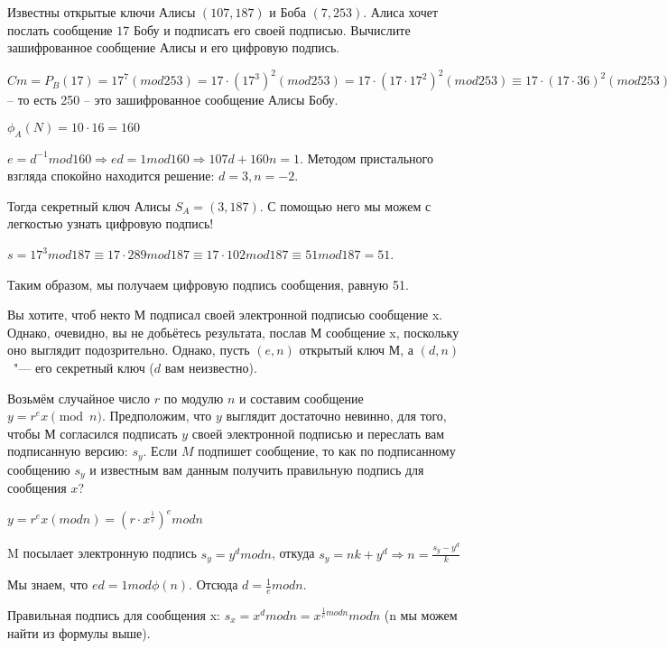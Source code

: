 \documentclass[12pt]{extreport}
\theoremstyle{definiton}
\theoremstyle{definition}
\theoremstyle{definition}
\newcounter{problem}
\newcounter{subproblem}
\def\beforPRskip{
	\bigskip
}
\def\pr{\beforPRskip\noindent\stepcounter{problem}{\bf \theproblem .\;}\setcounter{subproblem}{0}}
\def\prend{
	\bigskip
}
\begin{document}
	

\pr Известны открытые ключи Алисы $(107, 187)$ и Боба $(7, 253)$. Алиса хочет послать сообщение $17$ Бобу и подписать его своей подписью. Вычислите зашифрованное сообщение Алисы и его цифровую подпись.

\prend

$Cm = P_B(17) = 17^7 (mod 253) = 17 \cdot (17^3)^2 (mod 253) = 17 \cdot (17 \cdot 17^2)^2 (mod 253) \equiv 17 \cdot (17 \cdot 36)^2 (mod 253) \equiv 17 \cdot (106)^2 (mod 253) \equiv 17 \cdot 104 (mod 253) \equiv 250 (mod 253)$ -- то есть 250 -- это зашифрованное сообщение Алисы Бобу.

$\phi_A (N) = 10 \cdot 16 = 160$

$e = d^{-1} mod 160 \Rightarrow ed = 1 mod 160 \Rightarrow 107d + 160n = 1$. Методом пристального взгляда спокойно находится решение: $d = 3, n = -2$.

Тогда секретный ключ Алисы $S_A = (3, 187)$. С помощью него мы можем с легкостью узнать цифровую подпись!

$s = 17^3 mod 187 \equiv 17 \cdot 289 mod 187 \equiv 17 \cdot 102 mod 187 \equiv 51 mod 187 = 51$.

Таким образом, мы получаем цифровую подпись сообщения, равную 51.


\pr Вы хотите, чтоб некто М подписал своей электронной подписью сообщение x. Однако, очевидно, вы не добьётесь результата, послав М сообщение x, поскольку оно выглядит подозрительно. Однако, пусть $(e, n)$ открытый ключ М, а $(d, n)$~"--- его секретный ключ ($d$ вам неизвестно).

Возьмём случайное число $r$ по модулю $n$ и составим сообщение $y = r^ex \pmod n$.
Предположим, что $y$ выглядит достаточно невинно, для того, чтобы М согласился подписать
$y$ своей электронной подписью и переслать вам подписанную версию: $s_y$.
Если $M$ подпишет сообщение, то как по подписанному сообщению $s_y$ и известным вам данным
получить правильную подпись для сообщения $x$?

\prend

$y = r^ex (modn) = (r \cdot x^{\frac{1}{e}})^e mod n$

M посылает электронную подпись $s_y = y^d mod n$, откуда $s_y = nk + y^d \Rightarrow n = \frac{s_y - y^d}{k}$

Мы знаем, что $ed = 1 mod \phi (n)$. Отсюда $d = \frac{1}{e} mod n.$

Правильная подпись для сообщения x: $s_x = x^d mod n = x^{\frac{1}{e} mod n} mod n$ (n мы можем найти из формулы выше).
\end{document}
